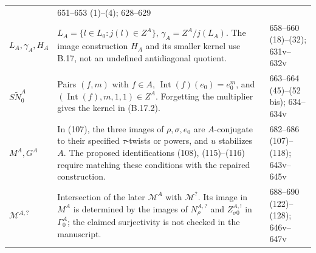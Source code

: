 \begin{longtable}{@{}p{.19\linewidth}p{.57\linewidth}p{.17\linewidth}@{}}
&651--653 (1)--(4); 628--629\\
\(L_A,\gamma_A,H_A\)&
\(L_A=\{l\in L_0:j(l)\in Z^A\}\),
\(\gamma_A=Z^A/j(L_A)\).
The image construction \(H_A\) and its smaller kernel
use B.17, not an undefined antidiagonal quotient.
&658--660 (18)--(32); 631v--632v\\
\(S\widetilde N_0^A\)&Pairs \((f,m)\) with
\(f\in A\), \(\operatorname{Int}(f)(e_0)=e_0^m\),
and \((\operatorname{Int}(f),m,1,1)\in Z^A\).
Forgetting the multiplier gives the kernel in (B.17.2).
&663--664 (45)--(52 bis); 634--634v\\
\(M^A,G^A\)&In (107), the three images of
\(\rho,\sigma,e_0\) are \(A\)-conjugate to their specified
\(\tau\)-twists or powers, and \(u\) stabilizes \(A\).
The proposed identifications (108), (115)--(116) require
matching these conditions with the repaired construction.
&682--686 (107)--(118); 643v--645v\\
\(\mathcal M^{A,?}\)&Intersection of the later
\(\mathcal M^A\) with \(\mathcal M^?\).  Its image in
\(M^A\) is determined by the images of
\(N_\rho^{A,?}\) and \(Z_{\sigma0}^{A,!}\) in
\(\Gamma_0^A\); the claimed surjectivity is not checked
in the manuscript.
&688--690 (122)--(128); 646v--647v\\
\bottomrule
\end{longtable}

